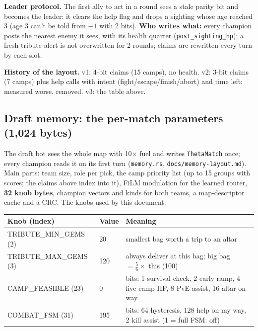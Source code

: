 \documentclass[11pt,a4paper]{article}
\newcommand{\f}[1]{\texttt{#1}}
\begin{document}
\textbf{Leader protocol.} The first ally to act in a round sees a stale parity bit and becomes the leader:
it clears the help flag and drops a sighting whose age reached 3 (age 3 can't be told from $-1$ with
2 bits). \textbf{Who writes what:} every champion posts the nearest enemy it sees, with its health quarter
(\f{post\_sighting\_hp}); a fresh tribute alert is not overwritten for 2 rounds; claims are rewritten every
turn by each slot.

\textbf{History of the layout.} v1: 4-bit claims (15 camps), no health. v2: 3-bit claims (7 camps) plus help
calls with intent (fight/escape/finish/abort) and time left; measured worse, removed. v3: the table above.

\subsection{Draft memory: the per-match parameters (1,024 bytes)}
The draft bot sees the whole map with 10$\times$ fuel and writes \f{ThetaMatch} once; every champion reads it
on its first turn (\f{memory.rs}, \f{docs/memory-layout.md}). Main parts: team size, role per pick, the camp
priority list (up to 15 groups with scores; the claims above index into it), FiLM modulation for the learned
router, \textbf{32 knob bytes}, champion vectors and kinds for both teams, a map-descriptor cache and a CRC.
The knobs used by this document:
{\small
\begin{tabularx}{\linewidth}{@{}llX@{}}
\toprule
Knob (index) & Value & Meaning\\
\midrule
TRIBUTE\_MIN\_GEMS (2) & 20 & smallest bag worth a trip to an altar\\
TRIBUTE\_MAX\_GEMS (3) & 120 & always deliver at this bag; big bag $=\frac56\times$ this (100)\\
CAMP\_FEASIBLE (23) & 0 & bits: 1 survival check, 2 early ramp, 4 live camp HP, 8 PvE assist, 16 altar on way\\
COMBAT\_FSM (31) & 195 & bits: 64 hysteresis, 128 help on my way, 2 kill assist (1 = full FSM: off)\\
\bottomrule
\end{tabularx}}
\end{document}
